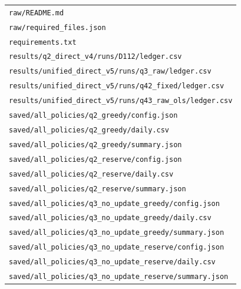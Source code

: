 \begin{longtable}{p{}}
\nolinkurl{raw/README.md} \\

\nolinkurl{raw/required_files.json} \\

\nolinkurl{requirements.txt} \\

\nolinkurl{results/q2_direct_v4/runs/D112/ledger.csv} \\

\nolinkurl{results/unified_direct_v5/runs/q3_raw/ledger.csv} \\

\nolinkurl{results/unified_direct_v5/runs/q42_fixed/ledger.csv} \\

\nolinkurl{results/unified_direct_v5/runs/q43_raw_ols/ledger.csv} \\

\nolinkurl{saved/all_policies/q2_greedy/config.json} \\

\nolinkurl{saved/all_policies/q2_greedy/daily.csv} \\

\nolinkurl{saved/all_policies/q2_greedy/summary.json} \\

\nolinkurl{saved/all_policies/q2_reserve/config.json} \\

\nolinkurl{saved/all_policies/q2_reserve/daily.csv} \\

\nolinkurl{saved/all_policies/q2_reserve/summary.json} \\

\nolinkurl{saved/all_policies/q3_no_update_greedy/config.json} \\

\nolinkurl{saved/all_policies/q3_no_update_greedy/daily.csv} \\

\nolinkurl{saved/all_policies/q3_no_update_greedy/summary.json} \\

\nolinkurl{saved/all_policies/q3_no_update_reserve/config.json} \\

\nolinkurl{saved/all_policies/q3_no_update_reserve/daily.csv} \\

\nolinkurl{saved/all_policies/q3_no_update_reserve/summary.json} \\


\end{longtable}
